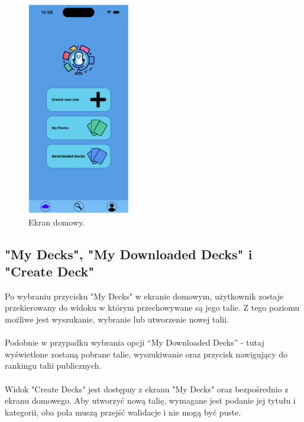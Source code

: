 \begin{figure}[H]
    \centering
    \includegraphics[width=0.4\textwidth]{chapters/chapter_10/images_mobile/mobile_home}
    \caption{Ekran domowy.}
    \label{img:mobile_home}
\end{figure}


\subsection{"My Decks", "My Downloaded Decks" i "Create Deck"}
Po wybraniu przycisku "My Decks" w ekranie domowym, użytkownik zostaje przekierowany do widoku w którym przechowywane są jego talie. Z tego poziomu możliwe jest wyszukanie, wybranie lub utworzenie nowej talii. \\\\
Podobnie w przypadku wybrania opcji “My Downloaded Decks” - tutaj wyświetlone zostaną pobrane talie, wyszukiwanie oraz przycisk nawigujący do rankingu talii publicznych. \\\\
Widok "Create Decks" jest dostępny z ekranu "My Decks" oraz bezpośrednio z ekranu domowego. Aby utworzyć nową talię, wymagane jest podanie jej tytułu i kategorii, oba pola muszą przejść walidacje i nie mogą być puste.


